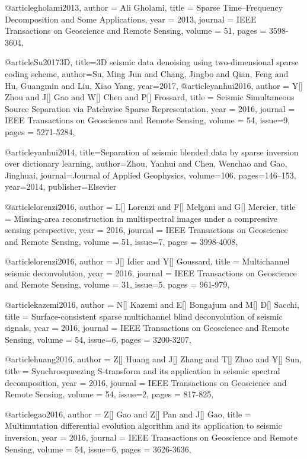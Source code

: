 @article{gholami2013,
  author =	 {Ali Gholami},
  title =	 {Sparse Time–Frequency Decomposition and Some Applications},
  year =	 2013,
  journal =	 {IEEE Transactions on Geoscience and Remote Sensing},
  volume =	 51,
  pages =	 {3598-3604},
}

@article{Su20173D,
  title={3D seismic data denoising using two-dimensional sparse coding scheme},
  author={Su, Ming Jun and Chang, Jingbo and Qian, Feng and Hu, Guangmin and Liu, Xiao Yang},
  year={2017},
}
@article{yanhui2016,
  author =	 {Y[] Zhou and J[] Gao and W[] Chen and P[] Frossard},
  title =	 {Seismic Simultaneous Source Separation via Patchwise Sparse Representation},
  year =	 2016,
  journal =	 {IEEE Transactions on Geoscience and Remote Sensing},
  volume =	 54,
  issue=9,
  pages =	 {5271-5284},
}

@article{yanhui2014,
  title={Separation of seismic blended data by sparse inversion over dictionary learning},
  author={Zhou, Yanhui and Chen, Wenchao and Gao, Jinghuai},
  journal={Journal of Applied Geophysics},
  volume={106},
  pages={146--153},
  year={2014},
  publisher={Elsevier}
}


@article{lorenzi2016,
  author =	 {L[] Lorenzi and F[] Melgani and G[] Mercier},
  title =	 {Missing-area reconstruction in multispectral images under a compressive sensing perspective},
  year =	 2016,
  journal =	 {IEEE Transactions on Geoscience and Remote Sensing},
  volume =	 51,
  issue=7,
  pages =	 {3998-4008},
}

@article{lorenzi2016,
  author =	 {J[] Idier and Y[] Goussard},
  title =	 {Multichannel seismic deconvolution},
  year =	 2016,
  journal =	 {IEEE Transactions on Geoscience and Remote Sensing},
  volume =	 31,
  issue=5,
  pages =	 {961-979},
}

@article{kazemi2016,
  author =	 {N[] Kazemi and E[] Bongajum and M[] D[] Sacchi},
  title =	 {Surface-consistent sparse multichannel blind deconvolution of seismic signals},
  year =	 2016,
  journal =	 {IEEE Transactions on Geoscience and Remote Sensing},
  volume =	 54,
  issue=6,
  pages =	 {3200-3207},
}

@article{huang2016,
  author =	 {Z[] Huang and J[] Zhang and T[] Zhao and Y[] Sun},
  title =	 {Synchrosqueezing {S}-transform and its application in seismic spectral decomposition},
  year =	 2016,
  journal =	 {IEEE Transactions on Geoscience and Remote Sensing},
  volume =	 54,
  issue=2,
  pages =	 {817-825},
}

@article{gao2016,
  author =	 {Z[] Gao and Z[] Pan and J[] Gao},
  title =	 {Multimutation differential evolution algorithm and its application to seismic inversion},
  year =	 2016,
  journal =	 {IEEE Transactions on Geoscience and Remote Sensing},
  volume =	 54,
  issue=6,
  pages =	 {3626-3636},
}


